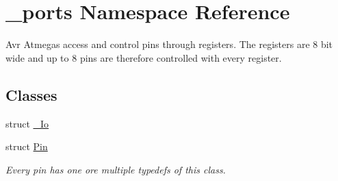 \hypertarget{namespace__ports}{}\section{\+\_\+ports Namespace Reference}
\label{namespace__ports}


Avr Atmegas access and control pins through registers. The registers are 8 bit wide and up to 8 pins are therefore controlled with every register.  


\subsection*{Classes}
\begin{DoxyCompactItemize}
\item 
struct \hyperlink{struct__ports_1_1__Io}{\+\_\+\+Io}
\item 
struct \hyperlink{struct__ports_1_1Pin}{Pin}
\begin{DoxyCompactList}\small\item\em Every pin has one ore multiple typedefs of this class. \end{DoxyCompactList}\end{DoxyCompactItemize}
